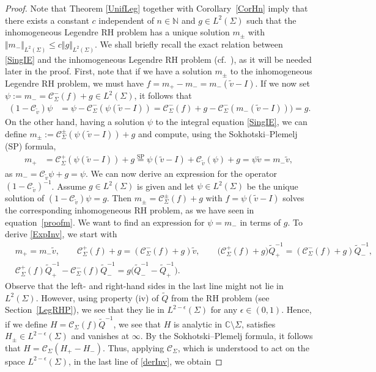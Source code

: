 \documentclass[10pt,a4paper]{amsart}
\newcommand{\C}{\mathbb{C}}
\newcommand{\Id}{I}
\newcommand{\tQ}{{\widetilde Q}}
\newcommand{\tv}{{\widetilde v}}
\newcommand{\Cau}{\mathcal C_{\Sigma}}
\newcommand{\Cautv}{\mathcal C_{\tv}}
\newcommand{\Ltwo}{L^2(\Sigma)}
\numberwithin{equation}{section}
\begin{document}
\begin{proof}
Note that Theorem \ref{UnifLeg} together with Corollary~\ref{CorHn} imply that there exists a constant $c$ independent of $n\in \mathbb{N}$ and $g\in \Ltwo$ such that the inhomogeneous Legendre RH problem has a unique solution $m_\pm$ with $\Vert m_- \Vert_{\Ltwo} \leq c\Vert g \Vert_{\Ltwo}$. We shall briefly recall the exact relation between \eqref{SingIE} and the inhomogeneous Legendre RH problem (cf.\ \cite[Section~2]{DZSob}), as it will be needed later in the proof. First, note that if we have a solution $m_\pm$ to the inhomogeneous Legendre RH problem, we must have $f = m_+ - m_- = m_-(\tv-\Id)$. If we now set $\psi := m_- = \Cau^-(f)+g \in \Ltwo$, it follows that
\begin{align*}
 (1-\Cautv)\psi &= \psi - \Cau^-(\psi (\tv-\Id))= \Cau^-(f) + g - \Cau^-(m_-(\tv-\Id)))= g.
\end{align*}
On the other hand, having a solution $\psi$ to the integral equation \eqref{SingIE}, we can define $m_\pm := \Cau^\pm(\psi (\tv-\Id)) + g$ and compute, using the Sokhotski--Plemelj (SP) formula,
\begin{align}\label{proofm}
 m_+ &= \Cau^+(\psi (\tv-\Id)) + g\overset{\text{SP}}{=} \psi (\tv-\Id) + \Cautv(\psi) + g= \psi \tv= m_- \tv,
\end{align}
as $m_- = \Cautv \psi + g = \psi$.
We can now derive an expression for the operator $(1 - \Cautv)^{-1}$. Assume $g \in \Ltwo$ is given and let $\psi \in \Ltwo$ be the unique solution of $(1-\Cautv)\psi = g$. Then $m_\pm = \Cau^\pm(f)+g$ with $f = \psi (\tv-\Id)$ solves the corresponding inhomogeneous RH problem, as we have seen in equation~\eqref{proofm}. We want to find an expression for $\psi = m_-$ in terms of $g$. To derive \eqref{ExpInv}, we start with
\begin{align}
& m_+ = m_- \tv, \qquad
 \Cau^+(f) + g = (\Cau^-(f) + g)\tilde v,\qquad \big(\Cau^+(f) + g\big)\tQ_+^{-1} = (\Cau^-(f) + g)\tQ_-^{-1},\nonumber
 \\
& \Cau^+(f)\tQ_+^{-1} - \Cau^-(f)\tQ_-^{-1} = g\big(\tQ_-^{-1}-\tQ_+^{-1}\big).\label{derInv}
 \end{align}
Observe that the left- and right-hand sides in the last line might not lie in $L^2(\Sigma)$. However, using property (iv) of $\tQ$ from the RH problem (see Section~\ref{LegRHP}), we see that they lie in $L^{2-\epsilon}(\Sigma)$ for any $\epsilon \in (0,1)$. Hence, if we define $H = \Cau(f) \tQ^{-1}$, we see that $H$ is analytic in $\C \setminus \Sigma$, satisfies $H_\pm \in L^{2-\epsilon}(\Sigma)$ and vanishes at $\infty$. By the Sokhotski--Plemelj formula, it follows that $H = \Cau(H_+-H_-)$. Thus, applying $\Cau$, which is understood to act on the space $L^{2-\epsilon}(\Sigma)$, in the last line of \eqref{derInv}, we obtain

\end{proof}
\end{document}
